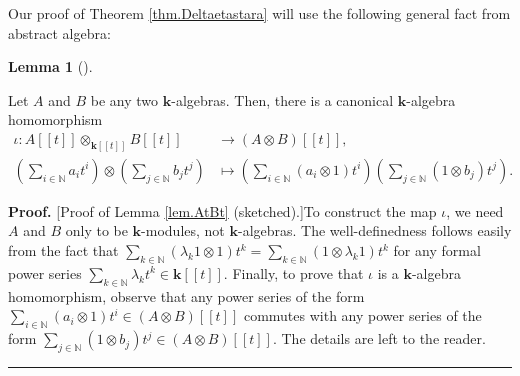 \documentclass[numbers=enddot,12pt,final,onecolumn,notitlepage]{scrartcl}%
\theoremstyle{definition}
\newtheorem{lem}[theo]{Lemma}
\newenvironment{lemma}[1][]
{\begin{lem}[#1]\begin{leftbar}}
{\end{leftbar}\end{lem}}
\newenvironment{proof}[1][Proof]{\noindent\textbf{#1.} }{\ \rule{0.5em}{0.5em}}
\let\sumnonlimits\sum
\renewcommand{\sum}{\sumnonlimits\limits}
\begin{document}
Our proof of Theorem \ref{thm.Deltaetastara} will use the following general
fact from abstract algebra:

\begin{lemma}
\label{lem.AtBt}Let $A$ and $B$ be any two $\mathbf{k}$-algebras. Then, there
is a canonical $\mathbf{k}$-algebra homomorphism%
\begin{align*}
\iota:A\left[  \left[  t\right]  \right]  \otimes_{\mathbf{k}\left[  \left[
t\right]  \right]  }B\left[  \left[  t\right]  \right]   &  \rightarrow\left(
A\otimes B\right)  \left[  \left[  t\right]  \right]  ,\\
\left(  \sum_{i\in\mathbb{N}}a_{i}t^{i}\right)  \otimes\left(  \sum
_{j\in\mathbb{N}}b_{j}t^{j}\right)   &  \mapsto\left(  \sum_{i\in\mathbb{N}%
}\left(  a_{i}\otimes1\right)  t^{i}\right)  \left(  \sum_{j\in\mathbb{N}%
}\left(  1\otimes b_{j}\right)  t^{j}\right)  .
\end{align*}

\end{lemma}

\begin{proof}
[Proof of Lemma \ref{lem.AtBt} (sketched).]To construct the map $\iota$, we
need $A$ and $B$ only to be $\mathbf{k}$-modules, not $\mathbf{k}$-algebras.
The well-definedness follows easily from the fact that $\sum_{k\in\mathbb{N}%
}\left(  \lambda_{k}1\otimes1\right)  t^{k}=\sum_{k\in\mathbb{N}}\left(
1\otimes\lambda_{k}1\right)  t^{k}$ for any formal power series $\sum
_{k\in\mathbb{N}}\lambda_{k}t^{k}\in\mathbf{k}\left[  \left[  t\right]
\right]  $. Finally, to prove that $\iota$ is a $\mathbf{k}$-algebra
homomorphism, observe that any power series of the form $\sum_{i\in\mathbb{N}%
}\left(  a_{i}\otimes1\right)  t^{i}\in\left(  A\otimes B\right)  \left[
\left[  t\right]  \right]  $ commutes with any power series of the form
$\sum_{j\in\mathbb{N}}\left(  1\otimes b_{j}\right)  t^{j}\in\left(  A\otimes
B\right)  \left[  \left[  t\right]  \right]  $. The details are left to the reader.
\end{proof}
\end{document}
